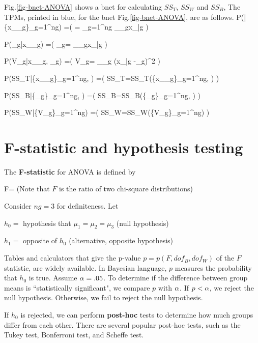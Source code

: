 Fig.\ref{fig-bnet-ANOVA}
shows a bnet for
calculating $SS_T$,
$SS_W$ and $SS_B$,
The TPMs, 
printed in blue,
for the bnet 
Fig.\ref{fig-bnet-ANOVA},
are as follows.
\beq\color{blue}
P(|\{x_{\Sigma_g}\}_{g=1}^{ng}) =\indi\left(
=
\sum_{g=1}^{ng}
\sum_{\s\in\Sigma_g}x_{\s|g}
\right)
\eeq


\beq\color{blue}
P(_g|x_{\Sigma_g}) =\indi\left(
_g=
\sum_{\s\in\Sigma_g}x_{\s|g}
\right)
\eeq

\beq\color{blue}
P(V_g|x_{\Sigma_g}, _g) =\indi\left(
V_g=
\sum_{\s\in\Sigma_g}
(x_{\s|g} -_g)^2
\right)
\eeq

\beq\color{blue}
P(SS_T|\{x_{\Sigma_g}\}_{g=1}^{ng},
) =\indi(
SS_T=SS_T(\{x_{\Sigma_g}\}_{g=1}^{ng},
)
)
\eeq

\beq\color{blue}
P(SS_B|\{_g\}_{g=1}^{ng},
) =\indi(
SS_B=SS_B(\{_g\}_{g=1}^{ng},
)
)
\eeq

\beq\color{blue}
P(SS_W|\{V_g\}_{g=1}^{ng}) =\indi(
SS_W=SS_W(\{V_g\}_{g=1}^{ng})
)
\eeq

\section{F-statistic and hypothesis testing}

The {\bf F-statistic} for ANOVA is defined by

\beq
F=
\eeq
(Note that $F$ 
is the ratio of two chi-square
distributions)

Consider $ng=3$ for definiteness. Let

$h_0=$ hypothesis that $\mu_1=\mu_2=\mu_3$ (null hypothesis) 

$h_1=$ opposite of $h_0$  (alternative, opposite hypothesis)

Tables 
and calculators that give 
the p-value $p=p(F, dof_B, dof_W)$
of the $F$ statistic,
are widely available. 
In Bayesian language,
$p$
measures
the probability
that $h_0$ is true.
Assume $\alpha=.05$.
To determine if the difference between group means is ``statistically significant", 
we compare $p$ with $\alpha$. 
If $p<\alpha$, we reject the null hypothesis.
Otherwise, we fail to reject the null hypothesis.

If $h_0$ is rejected,  we can  perform {\bf post-hoc} tests to determine how much groups differ from each other.
There are several  popular post-hoc tests,
such as 
the
Tukey test,
Bonferroni test, and 
Scheffe test.